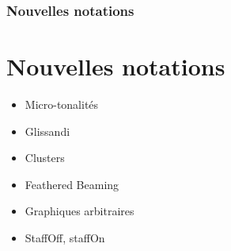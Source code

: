 \documentclass[12pt]{beamer}
\begin{document}

    \begin{frame}
    \frametitle{Nouvelles notations}
    \section{Nouvelles notations}
    
    \large
    
    \begin{itemize}
      \item Micro-tonalités
      \item Glissandi
      \item Clusters
      \item Feathered Beaming
      \item Graphiques arbitraires
      \item StaffOff, staffOn
    \end{itemize}
    
    \end{frame}
    

\end{document}
